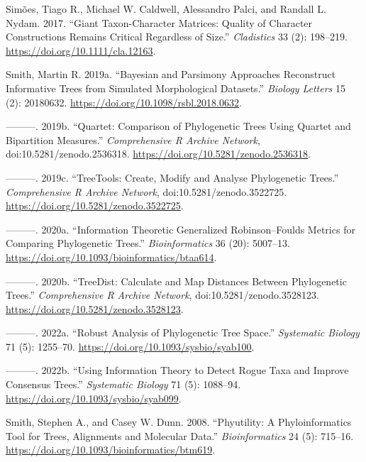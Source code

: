 \begin{CSLReferences}{1}{0}
\leavevmode{}%
Simões, Tiago R., Michael W. Caldwell, Alessandro Palci, and Randall L. Nydam. 2017. {``Giant Taxon-Character Matrices: Quality of Character Constructions Remains Critical Regardless of Size.''} \emph{Cladistics} 33 (2): 198--219. \url{https://doi.org/10.1111/cla.12163}.

\leavevmode{}%
Smith, Martin R. 2019a. {``Bayesian and Parsimony Approaches Reconstruct Informative Trees from Simulated Morphological Datasets.''} \emph{Biology Letters} 15 (2): 20180632. \url{https://doi.org/10.1098/rsbl.2018.0632}.

\leavevmode{}%
---------. 2019b. {``Quartet: Comparison of Phylogenetic Trees Using Quartet and Bipartition Measures.''} \emph{Comprehensive R Archive Network}, doi:10.5281/zenodo.2536318. \url{https://doi.org/10.5281/zenodo.2536318}.

\leavevmode{}%
---------. 2019c. {``{TreeTools}: Create, Modify and Analyse Phylogenetic Trees.''} \emph{Comprehensive R Archive Network}, doi:10.5281/zenodo.3522725. \url{https://doi.org/10.5281/zenodo.3522725}.

\leavevmode{}%
---------. 2020a. {``Information Theoretic {Generalized Robinson}--{Foulds} Metrics for Comparing Phylogenetic Trees.''} \emph{Bioinformatics} 36 (20): 5007--13. \url{https://doi.org/10.1093/bioinformatics/btaa614}.

\leavevmode{}%
---------. 2020b. {``{TreeDist}: Calculate and Map Distances Between Phylogenetic Trees.''} \emph{Comprehensive R Archive Network}, doi:10.5281/zenodo.3528123. \url{https://doi.org/10.5281/zenodo.3528123}.

\leavevmode{}%
---------. 2022a. {``Robust Analysis of Phylogenetic Tree Space.''} \emph{Systematic Biology} 71 (5): 1255--70. \url{https://doi.org/10.1093/sysbio/syab100}.

\leavevmode{}%
---------. 2022b. {``Using Information Theory to Detect Rogue Taxa and Improve Consensus Trees.''} \emph{Systematic Biology} 71 (5): 1088--94. \url{https://doi.org/10.1093/sysbio/syab099}.

\leavevmode{}%
Smith, Stephen A., and Casey W. Dunn. 2008. {``Phyutility: A Phyloinformatics Tool for Trees, Alignments and Molecular Data.''} \emph{Bioinformatics} 24 (5): 715--16. \url{https://doi.org/10.1093/bioinformatics/btm619}.


\end{CSLReferences}
